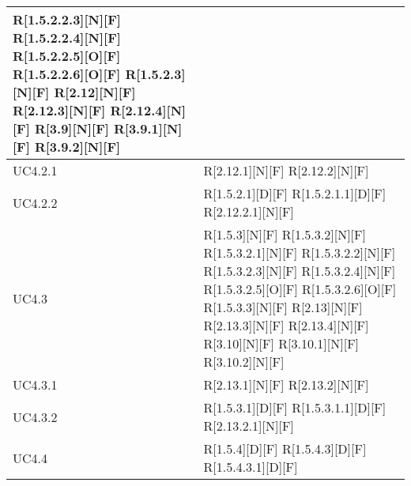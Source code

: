 \begin{longtable}{X | X}
R[1.5.2.2.3][N][F] \newline
R[1.5.2.2.4][N][F] \newline
R[1.5.2.2.5][O][F] \newline
R[1.5.2.2.6][O][F] \newline
R[1.5.2.3][N][F] \newline
R[2.12][N][F] \newline
R[2.12.3][N][F] \newline
R[2.12.4][N][F] \newline
R[3.9][N][F] \newline
R[3.9.1][N][F] \newline
R[3.9.2][N][F]  \\
\hline
UC4.2.1 & R[2.12.1][N][F] \newline
R[2.12.2][N][F]  \\
\hline
UC4.2.2 & R[1.5.2.1][D][F] \newline
R[1.5.2.1.1][D][F] \newline
R[2.12.2.1][N][F]  \\
\hline
UC4.3 & R[1.5.3][N][F] \newline
R[1.5.3.2][N][F] \newline
R[1.5.3.2.1][N][F] \newline
R[1.5.3.2.2][N][F] \newline
R[1.5.3.2.3][N][F] \newline
R[1.5.3.2.4][N][F] \newline
R[1.5.3.2.5][O][F] \newline
R[1.5.3.2.6][O][F] \newline
R[1.5.3.3][N][F] \newline
R[2.13][N][F] \newline
R[2.13.3][N][F] \newline
R[2.13.4][N][F] \newline
R[3.10][N][F] \newline
R[3.10.1][N][F] \newline
R[3.10.2][N][F]  \\
\hline
UC4.3.1 & R[2.13.1][N][F] \newline
R[2.13.2][N][F]  \\
\hline
UC4.3.2 & R[1.5.3.1][D][F] \newline
R[1.5.3.1.1][D][F] \newline
R[2.13.2.1][N][F]  \\
\hline
UC4.4 & R[1.5.4][D][F] \newline
R[1.5.4.3][D][F] \newline
R[1.5.4.3.1][D][F] \newline

\end{longtable}
